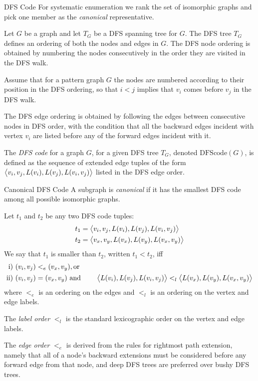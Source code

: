\begin{frame}[fragile]{DFS Code}
  For systematic enumeration we rank the set of isomorphic graphs and 
  pick one member as the {\em canonical} representative.

  \medskip
Let $G$ be a graph and let $T_G$ be a DFS spanning tree for $G$.  The
DFS tree $T_G$ def\/{i}nes an ordering of both the nodes and edges in $G$.
The DFS node ordering is obtained by numbering the nodes consecutively
in the order they are visited in the DFS walk.

  \medskip
Assume that for a pattern graph $G$ the nodes are
numbered according to their position in the DFS ordering,
so that $i < j$ implies that $v_i$ comes
before $v_{j}$ in the DFS walk.

  \medskip
The DFS edge
ordering is obtained by following the edges between consecutive nodes in
DFS order, with the condition that all the backward edges
incident with vertex $v_i$ are listed before any of the forward edges
incident with it.  

\medskip
The {\em DFS code}
for a graph $G$, for a given DFS
tree $T_G$, denoted $\text{DFScode}(G)$, is def\/{i}ned as the sequence of
extended edge tuples of the form
${\big\langle v_i,v_{j},L(v_i),L(v_{j}),L(v_i,v_{j}) \big\rangle}$ listed in the DFS edge
order.
\end{frame}



\begin{frame}{Canonical DFS Code}
  \small
A subgraph is {\em canonical}
if it has the smallest
DFS code among all possible isomorphic graphs.

\medskip
Let $t_1$ and $t_2$ be any two DFS code tuples:
\begin{align*}
t_1 &= {\big\langle v_i, v_{j}, L(v_i), L(v_{j}), L(v_i,v_{j}) \big\rangle}\\
t_2 &={\big\langle v_x, v_y, L(v_x), L(v_y), L(v_x,v_y) \big\rangle}
\end{align*}
We say that $t_1$ is smaller than $t_2$, written $t_1 < t_2$, iff
\begin{align*}
    \text{i) }& (v_i,v_{j}) <_e (v_x,v_y), \text{or}\\
    \text{ii) }&  (v_i,v_{j}) = (v_x,v_y) \text{ and }
      \qquad {\big\langle L(v_i), L(v_{j}), L(v_i,v_{j}) \big\rangle}
    <_l {\big\langle L(v_x), L(v_y), L(v_x,v_y) \big\rangle}
\end{align*}
where $<_e$ is an ordering on the edges and $<_l$ is an ordering on the
vertex and edge labels. 

\medskip
The {\em label order} $<_l$ is the standard
lexicographic order on the vertex and edge labels.

\medskip
The {\em edge order} $<_e$ is derived from
the rules for rightmost path extension, namely that all of a node's
backward extensions must be considered before any forward edge from
that node, and deep DFS trees are preferred over bushy DFS trees.

\end{frame}

